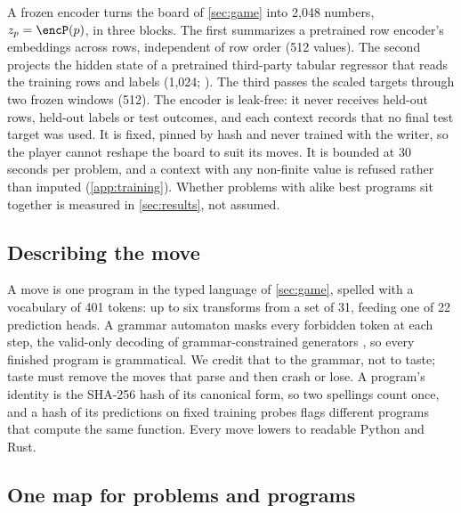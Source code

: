 A frozen encoder turns the board of \cref{sec:game} into 2,048 numbers, $z_p=\encP(p)$, in three
blocks. The first summarizes a pretrained row encoder's embeddings across rows, independent of row
order (512 values). The second projects the hidden state of a pretrained third-party tabular
regressor that reads the training rows and labels (1,024; ). The third
passes the scaled targets through two frozen windows (512). The encoder is
leak-free: it never receives held-out rows, held-out labels or test outcomes, and each context
records that no final test target was used. It is fixed, pinned by hash and never trained with the
writer, so the player cannot reshape the board to suit its moves. It is bounded at 30 seconds per
problem, and a context with any non-finite value is refused rather than imputed
(\cref{app:training}). Whether problems with alike best programs sit together is measured in
\cref{sec:results}, not assumed.

\subsection{Describing the move}\label{sub:method-move}

A move is one program in the typed language of \cref{sec:game}, spelled with a vocabulary of 401
tokens: up to six transforms from a set of 31, feeding one of 22 prediction heads. A grammar automaton masks every
forbidden token at each step, the valid-only decoding of grammar-constrained generators
\citep{kusner2017grammar,dai2018sdvae}, so every finished program is grammatical. We credit that to
the grammar, not to taste; taste must remove the moves that parse and then crash or lose. A program's
identity is the SHA-256 hash of its canonical form, so two spellings count once, and a hash of its
predictions on fixed training probes flags different programs that compute the same function. Every
move lowers to readable Python and Rust.

\subsection{One map for problems and programs}\label{sub:method-map}

